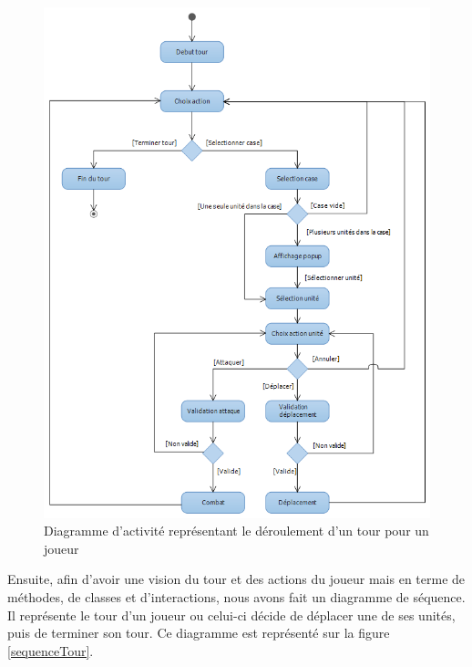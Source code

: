 \begin{figure}[!h] 
\centerline{\includegraphics[scale=0.58]{img/activite_tour_ex.png}}
   \caption{\label{étiquette} Diagramme d'activité représentant le déroulement d'un tour pour un joueur}
\label{activiteTour}
\end{figure}

Ensuite, afin d'avoir une vision du tour et des actions du joueur mais en terme de méthodes, de classes et d'interactions, nous avons fait un diagramme de séquence. Il représente le tour d'un joueur ou celui-ci décide de déplacer une de ses unités, puis de terminer son tour. Ce diagramme est représenté sur la figure \ref{sequenceTour}.\\

